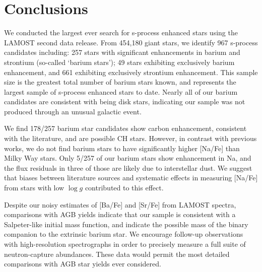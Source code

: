 \documentclass[a4paper,fleqn,usenatbib]{mnras}
\begin{document}
\section{Conclusions} \label{sec:con}

We conducted the largest ever search for s-process enhanced stars using the LAMOST second data release. From 454,180 giant stars, we identify 967 s-process candidates including: 257 stars with significant enhancements in barium and strontium (so-called `barium stars'); 49 stars exhibiting exclusively barium enhancement, and 661 exhibiting exclusively strontium enhancement. This sample size is the greatest total number of barium stars known, and represents the largest sample of s-process enhanced stars to date. Nearly all of our barium candidates are consistent with being disk stars, indicating our sample was not produced through an unusual galactic event. 

We find 178/257 barium star candidates show carbon enhancement, consistent with the literature, and are possible CH stars. However, in contrast with previous works, we do not find barium stars to have significantly higher [Na/Fe] than Milky Way stars. Only 5/257 of our barium stars show enhancement in Na, and the flux residuals in three of those are likely due to interstellar dust. We suggest that biases between literature sources and systematic effects in measuring [Na/Fe] from stars with low $\log{g}$ contributed to this effect. 

Despite our noisy estimates of [Ba/Fe] and [Sr/Fe] from LAMOST spectra, comparisons with AGB yields indicate that our sample is consistent with a Salpeter-like initial mass function, and indicate the possible mass of the binary companion to the extrinsic barium star. We encourage follow-up observations with high-resolution spectrographs in order to precisely measure a full suite of neutron-capture abundances. These data would permit the most detailed comparisons with AGB star yields ever considered.

 
\end{document}
